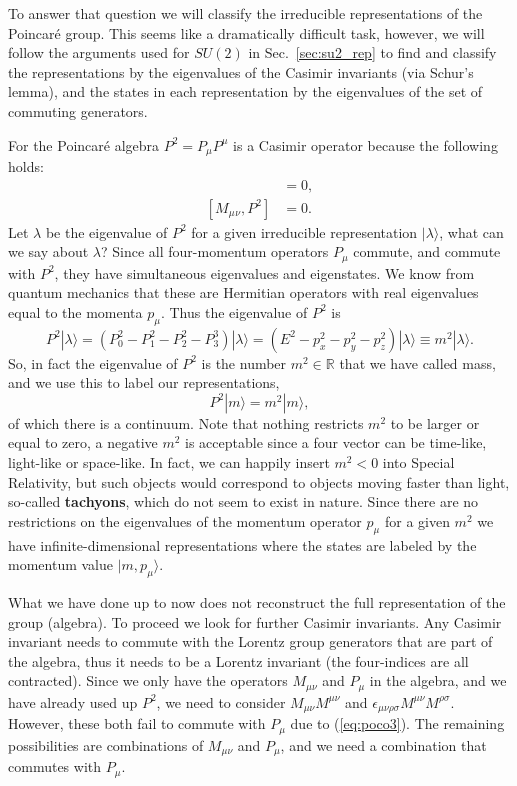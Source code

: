 \documentclass[notes.tex]{subfiles}
\begin{document}
To answer that question we will classify the irreducible representations of the Poincaré group. This seems like a dramatically difficult task, however, we will follow the arguments used for $SU(2)$ in Sec.~\ref{sec:su2_rep} to find and classify the representations by the eigenvalues of the Casimir invariants (via Schur's lemma), and the states in each representation by the eigenvalues of the set of commuting generators.

For the Poincaré algebra $P^2 = P_\mu P^\mu$ is a Casimir operator because the following holds:
\begin{align}
[P_\mu, P^2] &= 0,\\
[M_\mu{}_{\nu}, P^2]& = 0.
\end{align}
Let $\lambda$ be the eigenvalue of $P^2$ for a given irreducible representation  $|\lambda\rangle$, what can we say about $\lambda$? Since all four-momentum operators $P_\mu$ commute, and commute with $P^2$, they have simultaneous eigenvalues and eigenstates. We know from quantum mechanics that these are Hermitian operators with real eigenvalues equal to the momenta $p_\mu$. Thus the eigenvalue of $P^2$ is
\[P^2|\lambda \rangle = (P_0^2-P_1^2-P_2^2-P_3^3)|\lambda \rangle = (E^2-p_x^2-p_y^2-p_z^2)|\lambda\rangle \equiv m^2 |\lambda\rangle. \]
So, in fact the eigenvalue of $P^2$ is the number $m^2\in\mathbb R$ that we have called mass, and we use this to label our representations, 
\[P^2|m\rangle = m^2 |m\rangle,\]
of which there is a continuum. Note that nothing restricts $m^2$ to be larger or equal to zero, a negative $m^2$ is acceptable since a four vector can be time-like, light-like or space-like. In fact, we can happily insert $m^2<0$ into Special Relativity, but such objects would correspond to objects moving faster than light, so-called {\bf tachyons}, which do not seem to exist in nature. Since there are no restrictions on the eigenvalues of the momentum operator $p_\mu$ for a given $m^2$ we have infinite-dimensional representations where the states are labeled by the momentum value $ |m, p_\mu\rangle$.

What we have done up to now does not reconstruct the full representation of the group (algebra). To proceed we look for further Casimir invariants. Any Casimir invariant needs to commute with the Lorentz group generators that are part of the algebra, thus it needs to be a Lorentz invariant (the four-indices are all contracted). Since we only have the operators $M_{\mu\nu}$ and $P_\mu$ in the algebra, and we have already used up $P^2$, we need to consider $M_{\mu\nu}M^{\mu\nu}$ and $\epsilon_{\mu\nu\rho\sigma}M^{\mu\nu}M^{\rho\sigma}$. However, these both fail to commute with $P_\mu$ due to (\ref{eq:poco3}). The remaining possibilities are combinations of $M_{\mu\nu}$ and $P_\mu$, and we need a combination that commutes with $P_\mu$.
\end{document}
